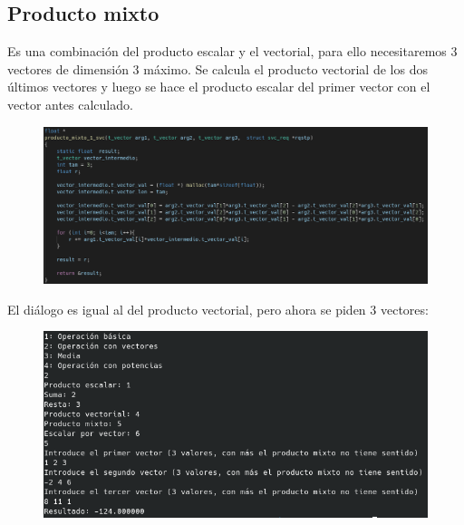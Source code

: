 \documentclass{article}
\begin{document}
	\subsection{Producto mixto}
	Es una combinación del producto escalar y el vectorial, para ello necesitaremos 3 vectores de dimensión 3 máximo. Se calcula el producto vectorial de los dos últimos vectores y luego se hace el producto escalar del primer vector con el vector antes calculado.
	\begin{figure}[H]
		\centering
		\includegraphics[totalheight=5cm]{img/15.png}
	\end{figure}
	El diálogo es igual al del producto vectorial, pero ahora se piden 3 vectores:
	\begin{figure}[H]
		\centering
		\includegraphics[totalheight=5.8cm]{img/16.png}
	\end{figure}
\end{document}
